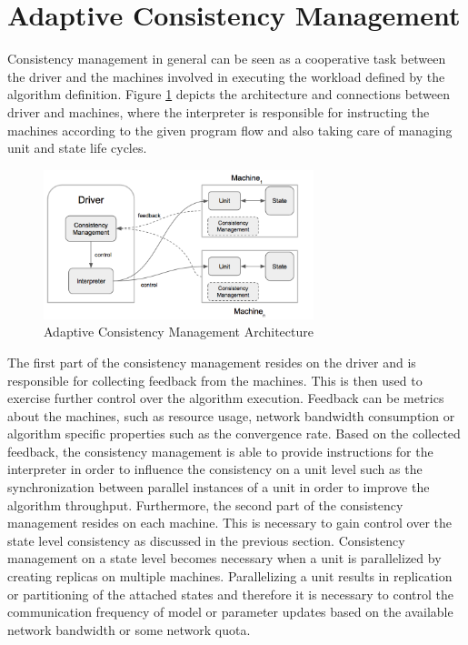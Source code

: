 \section{Adaptive Consistency Management}
Consistency management in general can be seen as a cooperative task between the driver and the machines involved in executing the workload defined by the algorithm definition.
Figure \ref{fig:adapt_consist_mgmt} depicts the architecture and connections between driver and machines, where the interpreter is responsible for instructing the machines according to the given program flow and also taking care of managing unit and state life cycles.
\begin{figure}[ht]
\centering
\includegraphics[width=0.7\textwidth]{img/adapt_consist_mgmt.png}
\caption{Adaptive Consistency Management Architecture}
\label{fig:adapt_consist_mgmt}
\end{figure}
The first part of the consistency management resides on the driver and is responsible for collecting feedback from the machines.
This is then used to exercise further control over the algorithm execution.
Feedback can be metrics about the machines, such as resource usage, network bandwidth consumption or algorithm specific properties such as the convergence rate.
Based on the collected feedback, the consistency management is able to provide instructions for the interpreter in order to influence the consistency on a unit level such as the synchronization between parallel instances of a unit in order to improve the algorithm throughput.
Furthermore, the second part of the consistency management resides on each machine.
This is necessary to gain control over the state level consistency as discussed in the previous section.
Consistency management on a state level becomes necessary when a unit is parallelized by creating replicas on multiple machines.
Parallelizing a unit results in replication or partitioning of the attached states and therefore it is necessary to control the communication frequency of model or parameter updates based on the available network bandwidth or some network quota.

